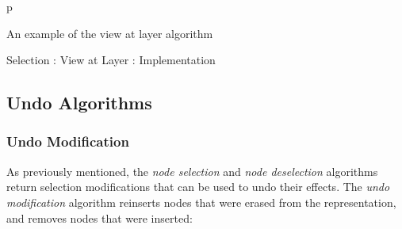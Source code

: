 \begin{stusubfig}{p}
	\hspace{4mm}%
\caption{An example of the view at layer algorithm}
\label{fig:ipfs-selection-viewatlayer}
\end{stusubfig}

\begin{stulisting}[p]
\caption{Selection : View at Layer : Implementation}
\label{code:ipfs-selection-viewatlayer}

\end{stulisting}

\afterpage{\clearpage}
\newpage

\subsection{Undo Algorithms}

\subsubsection{Undo Modification}

As previously mentioned, the \emph{node selection} and \emph{node deselection} algorithms return selection modifications that can be used to undo their effects. The \emph{undo modification} algorithm reinserts nodes that were erased from the representation, and removes nodes that were inserted:

